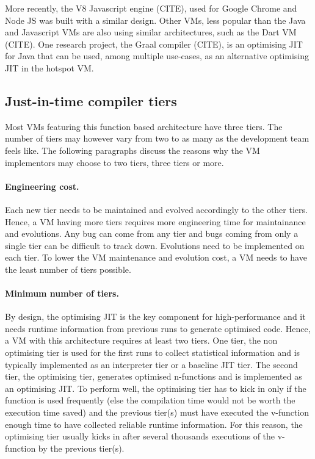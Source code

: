 \documentclass[a4paper,12pt,twoside]{../includes/ThesisStyle}
\begin{document}
More recently, the V8 Javascript engine (CITE), used for Google Chrome and Node JS was built with a similar design. Other VMs, less popular than the Java and Javascript VMs are also using similar architectures, such as the Dart VM (CITE). One research project, the Graal compiler (CITE), is an optimising JIT for Java that can be used, among multiple use-cases, as an alternative optimising JIT in the hotspot VM.

\subsection{Just-in-time compiler tiers}

Most VMs featuring this function based architecture have three tiers. The number of tiers may however vary from two to as many as the development team feels like. The following paragraphs discuss the reasons why the VM implementors may choose to two tiers, three tiers or more.

\paragraph{Engineering cost.} Each new tier needs to be maintained and evolved accordingly to the other tiers. Hence, a VM having more tiers requires more engineering time for maintainance and evolutions. Any bug can come from any tier and bugs coming from only a single tier can be difficult to track down. Evolutions need to be implemented on each tier. To lower the VM maintenance and evolution cost, a VM needs to have the least number of tiers possible.

\paragraph{Minimum number of tiers.} By design, the optimising JIT is the key component for high-performance and it needs runtime information from previous runs to generate optimised code. Hence, a VM with this architecture requires at least two tiers. One tier, the non optimising tier is used for the first runs to collect statistical information and is typically implemented as an interpreter tier or a baseline JIT tier. The second tier, the optimising tier, generates optimised n-functions and is implemented as an optimising JIT. To perform well, the optimising tier has to kick in only if the function is used frequently (else the compilation time would not be worth the execution time saved) and the previous tier(s) must have executed the v-function enough time to have collected reliable runtime information. For this reason, the optimising tier usually kicks in after several thousands executions of the v-function by the previous tier(s).
\end{document}
